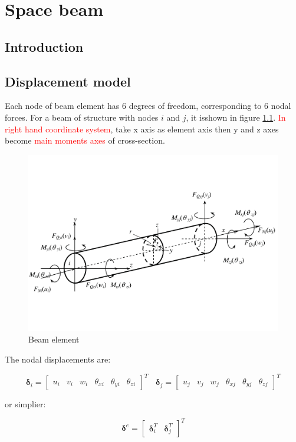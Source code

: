 
\chapter{Space beam}
\section{Introduction}

\section{Displacement model}
Each node of beam element has 6 degrees of freedom, corresponding to 6 nodal forces. For a beam of structure with nodes $ i $ and $ j $, it isshown in figure \ref{fig: space beam element}. \textcolor{red}{In right hand coordinate system}, take x axis as element axis then y and z axes become \textcolor{red}{main moments axes} of cross-section.

\begin{figure}[h!]
\centering
\includegraphics[width=0.5\linewidth]{figures/space_beam_element}
\caption{Beam element}
\label{fig: space beam element}
\end{figure}

The nodal displacements are:

\begin{equation}\label{eq: nodal displacements of beam}
\mathbf{\delta}_i = \begin{bmatrix}
u_i & v_i & w_i & \theta_{xi} & \theta_{yi} & \theta_{zi}
\end{bmatrix} ^T ~~~~ \mathbf{\delta}_j = \begin{bmatrix} u_j & v_j & w_j & \theta_{xj} & \theta_{yj} & \theta_{zj}
\end{bmatrix} ^T
\end{equation}

or simplier:

\begin{equation}\label{key}
\mathbf{\delta}^e = \begin{bmatrix} \mathbf{\delta}_i^T & \mathbf{\delta}_j^T \end{bmatrix}^T
\end{equation}


